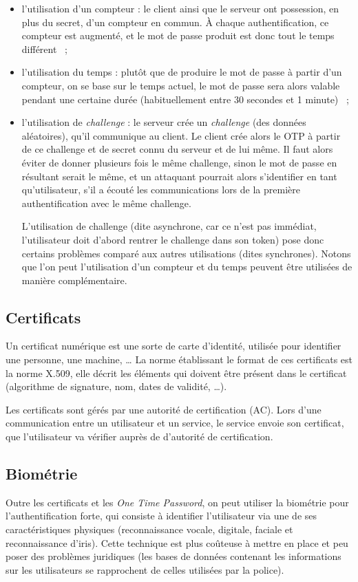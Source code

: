 \begin{itemize}
  \item l'utilisation d'un compteur : le client ainsi que le
serveur ont possession, en plus du secret, d'un compteur en
commun. À chaque authentification, ce compteur est augmenté, et le
mot de passe produit est donc tout le temps différent ~;
  \item l'utilisation du temps : plutôt que de produire le mot de
passe à partir d'un compteur, on se base sur le temps actuel, le
mot de passe sera alors valable pendant une certaine durée
(habituellement entre 30 secondes et 1 minute) ~;
  \item l'utilisation de \emph{challenge} : le serveur crée un
\emph{challenge} (des données aléatoires), qu'il communique au
client. Le client crée alors le OTP à partir de ce challenge et de
secret connu du serveur et de lui même. Il faut alors éviter de
donner plusieurs fois le même challenge, sinon le mot de passe en
résultant serait le même, et un attaquant pourrait alors
s'identifier en tant qu'utilisateur, s'il a écouté les
communications lors de la première authentification avec le même
challenge. 

L'utilisation de challenge (dite asynchrone, car ce n'est pas
immédiat, l'utilisateur doit d'abord rentrer le challenge dans 
son token) pose donc certains problèmes comparé aux autres 
utilisations (dites synchrones). Notons que l'on peut
l'utilisation d'un compteur et du temps peuvent être utilisées de
manière complémentaire.

\end{itemize}

\subsection{Certificats}
Un certificat numérique est une sorte de carte d'identité,
utilisée pour identifier une personne, une machine, …
La norme établissant le format de ces certificats est la norme
X.509, elle décrit les éléments qui doivent être présent dans le
certificat (algorithme de signature, nom, dates de validité, …).

Les certificats sont gérés par une autorité de certification (AC).
Lors d'une communication entre un utilisateur et un service,
le service envoie son certificat, que l'utilisateur va vérifier
auprès de d'autorité de certification.


\subsection{Biométrie}
Outre les certificats et les \emph{One Time Password}, on peut
utiliser la biométrie pour l'authentification forte, qui consiste
à identifier l'utilisateur via une de ses caractéristiques
physiques (reconnaissance vocale, digitale, faciale et
reconnaissance d'iris).
Cette technique est plus coûteuse à mettre en place et peu poser
des problèmes juridiques (les bases de données contenant les
informations sur les utilisateurs se rapprochent de celles
utilisées par la police).

